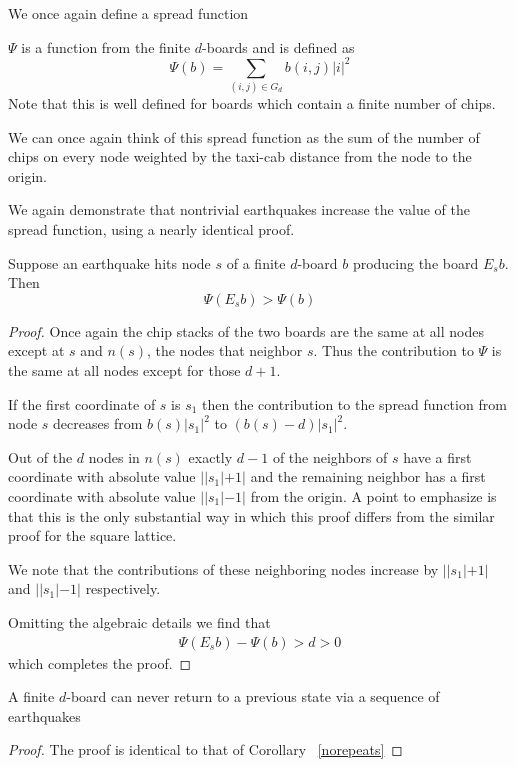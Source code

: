 \documentclass[runningheads,a4paper]{llncs}
\begin{document}
We once again define a spread function 
\begin{definition}
$\Psi$ is a function from the finite $d$-boards and is defined as
\begin{equation*}
\Psi(b) = \sum_{(i,j) \in G_d} b(i,j) |i|^2
\end{equation*}
Note that this is well defined for boards which contain a finite number of chips. 
\end{definition} 
We can once again think of this spread function as the sum of the number of chips on every node weighted by the taxi-cab distance from the node to the origin. 

We again demonstrate that nontrivial earthquakes increase the value of the spread function, using a nearly identical proof.
\begin{lemma} 
Suppose an earthquake hits node $s$ of a finite $d$-board $b$ producing the board $E_s b$. Then
\begin{equation*}
\Psi( E_s b) > \Psi (b)
\end{equation*}
\end{lemma}
\begin{proof}
Once again the chip stacks of the two boards are the same at all nodes except at $s$ and $n(s)$, the nodes that neighbor $s$. Thus the contribution to $\Psi$ is the same at all nodes except for those $d+1$.

If the first coordinate of $s$ is $s_1$ then the contribution to the spread function from node $s$ decreases from $b(s)|s_1|^2$ to $(b(s)-d)|s_1|^2$. 

Out of the $d$ nodes in $n(s)$ exactly $d-1$ of the neighbors of $s$ have a first coordinate with absolute value $||s_1| +1|$ and the remaining neighbor has a first coordinate with absolute value $||s_1| - 1|$ from the origin.  A point to emphasize is that this is the only substantial way in which this proof differs from the similar proof for the square lattice. 

We note that the contributions of these neighboring nodes increase by $||s_1| +1|$ and $||s_1|-1|$ respectively. 

Omitting the algebraic details we find that 
\begin{align*}
\Psi( E_s b) - \Psi(b) > d >0
\end{align*}
which completes the proof.
\end{proof}


\begin{corollary}
\label{notreerepeats}
A finite $d$-board can never return to a previous state via a sequence of earthquakes
\end{corollary}
\begin{proof}
The proof is identical to that of Corollary ~\ref{norepeats}
\end{proof}
\end{document}
